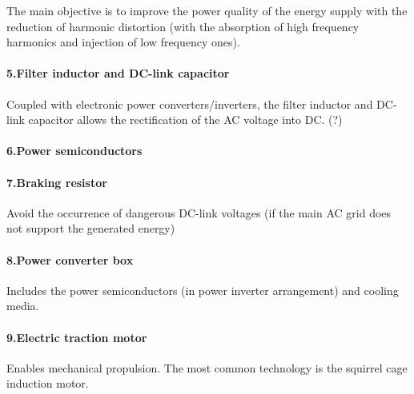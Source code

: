 	The main objective is to improve the power quality of the energy supply with the reduction of harmonic distortion (with the absorption of high frequency harmonics and injection of low frequency ones).

\paragraph{5.Filter inductor and DC-link capacitor\\}

	Coupled with electronic power converters/inverters, the filter inductor and DC-link capacitor allows the rectification of the AC voltage into DC. (?)
	
\paragraph{6.Power semiconductors\\}


\paragraph{7.Braking resistor\\}

	Avoid the occurrence of dangerous DC-link voltages (if the main AC grid does not support the generated energy)

\paragraph{8.Power converter box\\}

	Includes the power semiconductors (in power inverter arrangement) and cooling media.

\paragraph{9.Electric traction motor\\}

	Enables mechanical propulsion. The most common technology is the squirrel cage induction motor.


